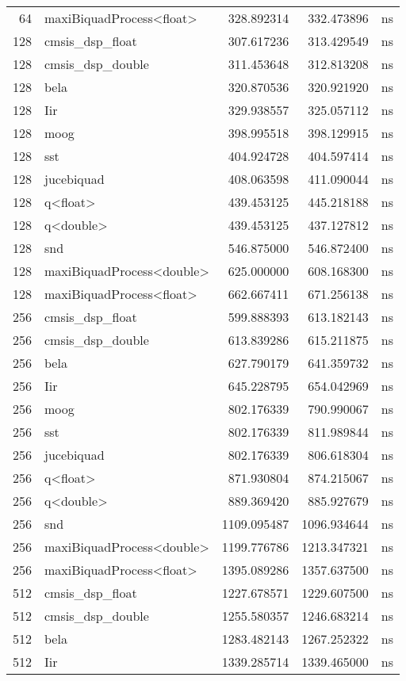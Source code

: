 \begin{tabular}{rlrrl}
64 & maxiBiquadProcess<float> & 328.892314 & 332.473896 & ns \\
128 & cmsis\_dsp\_float & 307.617236 & 313.429549 & ns \\
128 & cmsis\_dsp\_double & 311.453648 & 312.813208 & ns \\
128 & bela & 320.870536 & 320.921920 & ns \\
128 & Iir & 329.938557 & 325.057112 & ns \\
128 & moog & 398.995518 & 398.129915 & ns \\
128 & sst & 404.924728 & 404.597414 & ns \\
128 & jucebiquad & 408.063598 & 411.090044 & ns \\
128 & q<float> & 439.453125 & 445.218188 & ns \\
128 & q<double> & 439.453125 & 437.127812 & ns \\
128 & snd & 546.875000 & 546.872400 & ns \\
128 & maxiBiquadProcess<double> & 625.000000 & 608.168300 & ns \\
128 & maxiBiquadProcess<float> & 662.667411 & 671.256138 & ns \\
256 & cmsis\_dsp\_float & 599.888393 & 613.182143 & ns \\
256 & cmsis\_dsp\_double & 613.839286 & 615.211875 & ns \\
256 & bela & 627.790179 & 641.359732 & ns \\
256 & Iir & 645.228795 & 654.042969 & ns \\
256 & moog & 802.176339 & 790.990067 & ns \\
256 & sst & 802.176339 & 811.989844 & ns \\
256 & jucebiquad & 802.176339 & 806.618304 & ns \\
256 & q<float> & 871.930804 & 874.215067 & ns \\
256 & q<double> & 889.369420 & 885.927679 & ns \\
256 & snd & 1109.095487 & 1096.934644 & ns \\
256 & maxiBiquadProcess<double> & 1199.776786 & 1213.347321 & ns \\
256 & maxiBiquadProcess<float> & 1395.089286 & 1357.637500 & ns \\
512 & cmsis\_dsp\_float & 1227.678571 & 1229.607500 & ns \\
512 & cmsis\_dsp\_double & 1255.580357 & 1246.683214 & ns \\
512 & bela & 1283.482143 & 1267.252322 & ns \\
512 & Iir & 1339.285714 & 1339.465000 & ns \\

\end{tabular}
